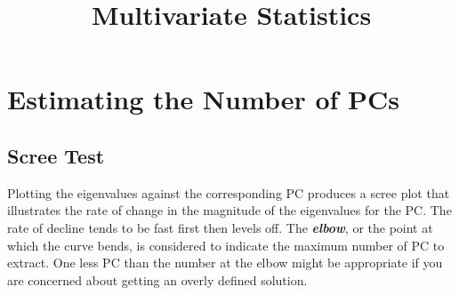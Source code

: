 \documentclass[12pt]{article}
\title{Multivariate Statistics}
\begin{document}
\section*{Estimating the Number of PCs}


\subsection*{Scree Test} Plotting the eigenvalues against the
corresponding PC produces a scree plot that illustrates
the rate of change in the magnitude of the eigenvalues
for the PC. The rate of decline tends to be fast first then
levels off. The \textit{\textbf{elbow}}, or the point at which the curve
bends, is considered to indicate the maximum number
of PC to extract. One less PC than the number at the
elbow might be appropriate if you are concerned about
getting an overly defined solution.
\end{document}
